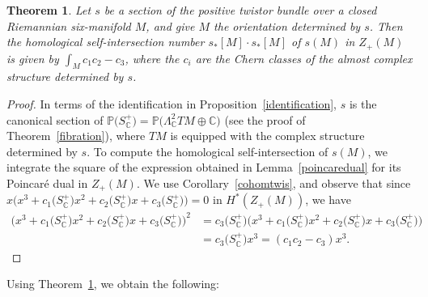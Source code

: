 \documentclass[pdftex]{sigma}%
\newcommand{\C}{\mathbb{C}}
\numberwithin{equation}{section}
\newtheorem{Theorem}{Theorem}[section]
\begin{document}
\begin{Theorem}\label{selfintersection}
Let $s$ be a section of the positive twistor bundle over a closed Riemannian six-manifold $M$, and give $M$ the orientation determined by $s$. Then the homological self-intersection number $s_*[M] \cdot s_*[M]$ of $s(M)$ in $Z_+(M)$ is given by $\int_M c_1c_2 - c_3$, where the $c_i$ are the Chern classes of the almost complex structure determined by $s$.

\end{Theorem}
\begin{proof} In terms of the identification in Proposition~\ref{identification}, $s$ is the canonical section of $\mathbb{P}\big(S_{\C}^+\big) = \mathbb{P}\big(\Lambda_\C^2 TM \oplus \C\big)$ (see the proof of Theorem~\ref{fibration}), where $TM$ is equipped with the complex structure determined by $s$. To compute the homological self-intersection of $s(M)$, we integrate the square of the expression obtained in Lemma~\ref{poincaredual} for its Poincar\'e dual in $Z_+(M)$. We use Corollary~\ref{cohomtwis}, and observe that since $x\big(x^3 + c_1\big(S_{\C}^+\big)x^2 + c_2\big(S_{\C}^+\big)x + c_3\big(S_{\C}^+\big)\big) = 0$ in $H^*(Z_+(M))$, we have
\begin{align*}
\big(x^3 + c_1\big(S_{\C}^+\big)x^2 + c_2\big(S_{\C}^+\big)x + c_3\big(S_{\C}^+\big)\big)^2 &= c_3\big(S_{\C}^+\big)\big(x^3 + c_1\big(S_{\C}^+\big)x^2 + c_2\big(S_{\C}^+\big)x + c_3\big(S_{\C}^+\big)\big) \\ &= c_3\big(S_{\C}^+\big) x^3 = (c_1c_2 - c_3)x^3. \tag*{\qed}
\end{align*}\renewcommand{\qed}{}
\end{proof}

Using Theorem~\ref{selfintersection}, we obtain the following:
\end{document}
